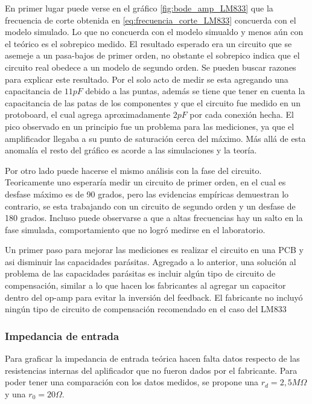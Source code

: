 

En primer lugar puede verse en el gráfico \ref{fig:bode_amp_LM833} que la frecuencia de corte obtenida en \ref{eq:frecuencia_corte_LM833} concuerda con el modelo simulado. Lo que no concuerda con el modelo simualdo y menos aún con el teórico es el sobrepico medido. El resultado esperado era un circuito que se asemeje a un pasa-bajos de primer orden, no obstante el sobrepico indica que el circuito real obedece a un modelo de segundo orden. Se pueden buscar razones para explicar este resultado. Por el solo acto de medir se esta agregando una capacitancia de $11pF$ debido a las puntas, además se tiene que tener en cuenta la capacitancia de las patas de los componentes y que el circuito fue medido en un protoboard, el cual agrega aproximadamente $2pF$ por cada conexión hecha. El pico observado en un principio fue un problema para las mediciones, ya que el amplificador llegaba a su punto de saturación cerca del máximo. Más allá de esta anomalía el resto del gráfico es acorde a las simulaciones y la teoría. 

Por otro lado puede hacerse el mismo análisis con la fase del circuito. Teoricamente uno esperaría medir un circuito de primer orden, en el cual es desfase máximo es de 90 grados, pero las evidencias empíricas demuestran lo contrario, se esta trabajando con un circuito de segundo orden y un desfase de 180 grados. Incluso puede observarse a que a altas frecuencias hay un salto en la fase simulada, comportamiento que no logró medirse en el laboratorio.

Un primer paso para mejorar las mediciones es realizar el circuito en una PCB y asi disminuir las capacidades parásitas. Agregado a lo anterior, una solución al problema de las capacidades parásitas es incluir algún tipo de circuito de compensación, similar a lo que hacen los fabricantes al agregar un capacitor dentro del op-amp para evitar la inversión del feedback. El fabricante no incluyó ningún tipo de circuito de compensación recomendado en el caso del LM833 

\subsubsection{Impedancia de entrada}

Para graficar la impedancia de entrada teórica hacen falta datos respecto de las resistencias internas del aplificador que no fueron dados por el fabricante. Para poder tener una comparación con los datos medidos, se propone una $r_d = 2,5M\Omega$ y una $r_0 = 20 \Omega$. 


